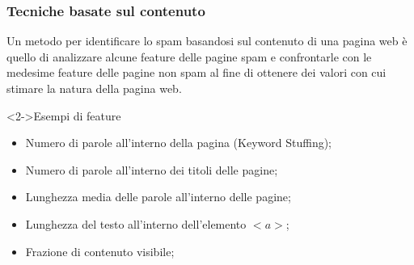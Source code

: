 \documentclass{beamer}
\begin{document}
\begin{frame}
    \frametitle{Tecniche basate sul contenuto}
    Un metodo per identificare lo spam basandosi sul contenuto di una pagina web è  quello di analizzare alcune feature delle pagine spam e confrontarle con le medesime feature delle pagine non spam al fine di ottenere dei valori con cui stimare la natura della pagina web.
    \begin{block}<2->{Esempi di feature}
    \begin{itemize}
    \item Numero di parole all'interno della pagina (Keyword Stuffing);
    \item Numero di parole all'interno dei titoli delle pagine;
    \item Lunghezza media delle parole all'interno delle pagine;
    \item Lunghezza del testo all'interno dell'elemento \(<a>\);
    \item Frazione di contenuto visibile;
    \end{itemize}
    \end{block}
\end{frame}
\end{document}
